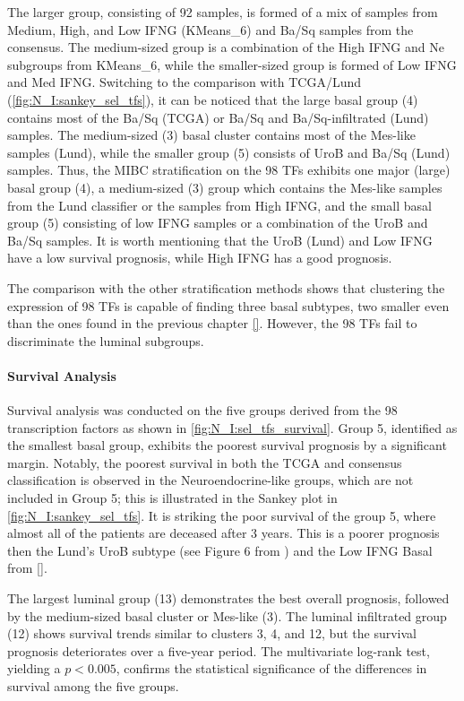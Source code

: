 The larger group, consisting of 92 samples, is formed of a mix of samples from Medium, High, and Low IFNG (KMeans\_6) and Ba/Sq samples from the consensus. The medium-sized group is a combination of the High IFNG and Ne subgroups from KMeans\_6, while the smaller-sized group is formed of Low IFNG and Med IFNG. Switching to the comparison with TCGA/Lund (\cref{fig:N_I:sankey_sel_tfs}), it can be noticed that the large basal group (4) contains most of the Ba/Sq (TCGA) or Ba/Sq and Ba/Sq-infiltrated (Lund) samples. The medium-sized (3) basal cluster contains most of the Mes-like samples (Lund), while the smaller group (5) consists of UroB and Ba/Sq (Lund) samples. Thus, the MIBC stratification on the 98 TFs exhibits one major (large) basal group (4), a medium-sized (3) group which contains the Mes-like samples from the Lund classifier or the samples from High IFNG, and the small basal group (5) consisting of low IFNG samples or a combination of the UroB and Ba/Sq samples. It is worth mentioning that the UroB (Lund) and Low IFNG have a low survival prognosis, while High IFNG has a good prognosis.

The comparison with the other stratification methods shows that clustering the expression of 98 TFs is capable of finding three basal subtypes, two smaller even than the ones found in the previous chapter \ref{}. However, the 98 TFs fail to discriminate the luminal subgroups.

\paragraph*{Survival Analysis}

Survival analysis was conducted on the five groups derived from the 98 transcription factors as shown in \cref{fig:N_I:sel_tfs_survival}. Group 5, identified as the smallest basal group, exhibits the poorest survival prognosis by a significant margin. Notably, the poorest survival in both the TCGA and consensus classification is observed in the Neuroendocrine-like groups, which are not included in Group 5; this is illustrated in the Sankey plot in \cref{fig:N_I:sankey_sel_tfs}. It is striking the poor survival of the group 5, where almost all of the patients are deceased after 3 years. This is a poorer prognosis then the Lund's UroB subtype (see Figure 6 from \cite{Marzouka2018-ge}) and the Low IFNG Basal from \ref{}.

The largest luminal group (13) demonstrates the best overall prognosis, followed by the medium-sized basal cluster or Mes-like (3). The luminal infiltrated group (12) shows survival trends similar to clusters 3, 4, and 12, but the survival prognosis deteriorates over a five-year period. The multivariate log-rank test, yielding a $p<0.005$, confirms the statistical significance of the differences in survival among the five groups.


